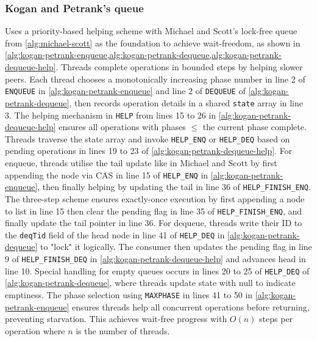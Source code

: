 \subsubsection{Kogan and Petrank's queue} 
Uses a priority-based helping scheme with Michael and Scott's lock-free queue from \cref{alg:michael-scott} as the foundation to achieve wait-freedom, as shown in \cref{alg:kogan-petrank-enqueue,alg:kogan-petrank-dequeue,alg:kogan-petrank-dequeue-help}. Threads complete operations in bounded steps by helping slower peers. Each thread chooses a monotonically increasing phase number in line 2 of \texttt{ENQUEUE} in \cref{alg:kogan-petrank-enqueue} and line 2 of \texttt{DEQUEUE} of \cref{alg:kogan-petrank-dequeue}, then records operation details in a shared \texttt{state} array in line 3. The helping mechanism in \texttt{HELP} from lines 15 to 26 in \cref{alg:kogan-petrank-dequeue-help} ensures all operations with phases $\leq$ the current phase complete. Threads traverse the state array and invoke \texttt{HELP\_ENQ} or \texttt{HELP\_DEQ} based on pending operations in lines 19 to 23 of \cref{alg:kogan-petrank-dequeue-help}. For enqueue, threads utilise the tail update like in Michael and Scott by first appending the node via \ac{CAS} in line 15 of \texttt{HELP\_ENQ} in \cref{alg:kogan-petrank-enqueue}, then finally helping by updating the tail in line 36 of \texttt{HELP\_FINISH\_ENQ}. The three-step scheme ensures exactly-once execution by first appending a node to list in line 15 then clear the pending flag in line 35 of \texttt{HELP\_FINISH\_ENQ}, and finally update the tail pointer in line 36. For dequeue, threads write their ID to the \texttt{deqTid} field of the head node in line 41 of \texttt{HELP\_DEQ} in \cref{alg:kogan-petrank-dequeue} to "lock" it logically. The consumer then updates the pending flag in line 9 of \texttt{HELP\_FINISH\_DEQ} in \cref{alg:kogan-petrank-dequeue-help} and advances head in line 10. Special handling for empty queues occurs in lines 20 to 25 of \texttt{HELP\_DEQ} of \cref{alg:kogan-petrank-dequeue}, where threads update state with null to indicate emptiness. The phase selection using \texttt{MAXPHASE} in lines 41 to 50 in \cref{alg:kogan-petrank-enqueue} ensures threads help all concurrent operations before returning, preventing starvation. This achieves wait-free progress with $O(n)$ steps per operation where $n$ is the number of threads. \cite{Kogan2011WaitFreeQueues}

